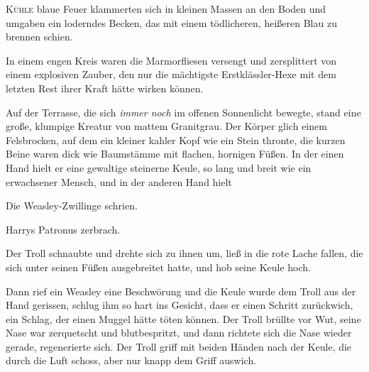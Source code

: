 
\lettrine{K}{ühle} blaue Feuer klammerten sich in kleinen Massen an den Boden und umgaben ein loderndes Becken, das mit einem tödlicheren, heißeren Blau zu brennen schien.

In einem engen Kreis waren die Marmorfliesen versengt und zersplittert von einem explosiven Zauber, den nur die mächtigste Erstklässler-Hexe mit dem letzten Rest ihrer Kraft hätte wirken können.

Auf der Terrasse, die sich \emph{immer noch} im offenen Sonnenlicht bewegte, stand eine große, klumpige Kreatur von mattem Granitgrau. Der Körper glich einem Felsbrocken, auf dem ein kleiner kahler Kopf wie ein Stein thronte, die kurzen Beine waren dick wie Baumstämme mit flachen, hornigen Füßen. In der einen Hand hielt er eine gewaltige steinerne Keule, so lang und breit wie ein erwachsener Mensch, und in der anderen Hand hielt 

Die Weasley-Zwillinge schrien.

Harrys Patronus zerbrach.

Der Troll schnaubte und drehte sich zu ihnen um, ließ  in die rote Lache fallen, die sich unter seinen Füßen ausgebreitet hatte, und hob seine Keule hoch.

Dann rief ein Weasley eine Beschwörung und die Keule wurde dem Troll aus der Hand gerissen, schlug ihm so hart ins Gesicht, dass er einen Schritt zurückwich, ein Schlag, der einen Muggel hätte töten können. Der Troll brüllte vor Wut, seine Nase war zerquetscht und blutbespritzt, und dann richtete sich die Nase wieder gerade, regenerierte sich. Der Troll griff mit beiden Händen nach der Keule, die durch die Luft schoss, aber nur knapp dem Griff auswich.


